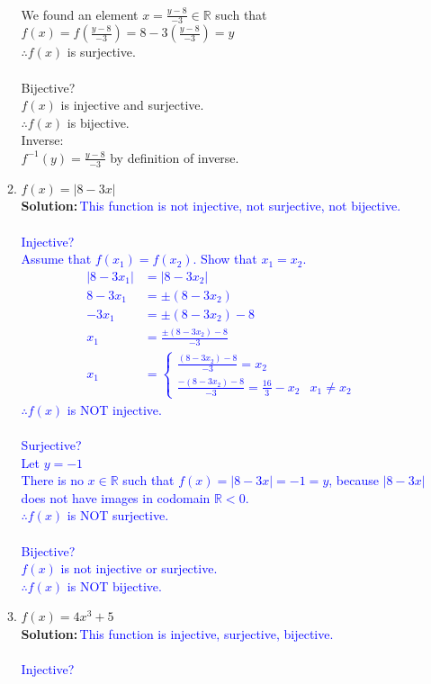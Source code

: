 \documentclass{article}
\newcommand{\sol}[1]{\textbf{Solution:\,}\textcolor{blue}{#1}}
\begin{document}
\begin{enumerate}
\begin{enumerate}
{\\We found an element $x=\frac{y-8}{-3}\in\mathbb{R}$ such that $f(x)=f(\frac{y-8}{-3})=8-3(\frac{y-8}{-3})=y$
\\$\therefore f(x)$ is surjective.
\\\\Bijective?
\\$f(x)$ is injective and surjective.
\\$\therefore f(x)$ is bijective.
\\Inverse:
\\$f^{-1}(y)=\frac{y-8}{-3}$ by definition of inverse.
}\\
\item $f(x) = |8 - 3 x|$
\\\sol{This function is not injective, not surjective, not bijective.
\\\\Injective?
\\Assume that $f(x_1)=f(x_2)$. Show that $x_1=x_2$.
\begin{align*}
|8-3x_1|&=|8-3x_2|&\text{}\\
8-3x_1&=\pm(8-3x_2)&\text{}\\
-3x_1&=\pm(8-3x_2)-8&\text{}\\
x_1&=\frac{\pm(8-3x_2)-8}{-3}&\text{}\\
x_1&=\begin{cases}\frac{(8-3x_2)-8}{-3}=x_2&\text{}\\\frac{-(8-3x_2)-8}{-3}=\frac{16}{3}-x_2&\text{$x_1\neq x_2$}\end{cases}
\end{align*}
$\therefore f(x)$ is NOT injective.
\\\\Surjective?
\\Let $y=-1$
\\There is no $x\in\mathbb{R}$ such that $f(x)=|8 - 3 x|=-1=y$, because $|8 - 3 x|$ does not have images in codomain $\mathbb{R}<0$.
\\$\therefore f(x)$ is NOT surjective.
\\\\Bijective?
\\$f(x)$ is not injective or surjective.
\\$\therefore f(x)$ is NOT bijective.
}\\
\item $f(x) = 4x^3 + 5$
\\\sol{This function is injective, surjective, bijective.
\\\\Injective?
}
\end{enumerate}
\end{enumerate}
\end{document}
